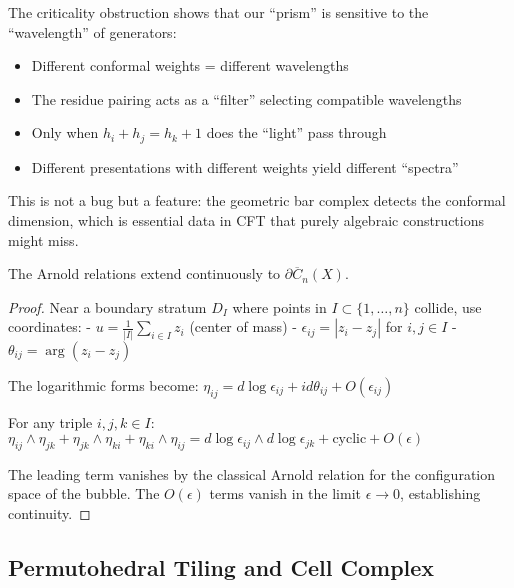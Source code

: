   \begin{remark}
   The criticality obstruction shows that our ``prism'' is sensitive to the ``wavelength'' of generators:
   \begin{itemize}
   \item Different conformal weights = different wavelengths
   \item The residue pairing acts as a ``filter'' selecting compatible wavelengths
   \item Only when $h_i + h_j = h_k + 1$ does the ``light'' pass through
   \item Different presentations with different weights yield different ``spectra''
   \end{itemize}
   
   This is not a bug but a feature: the geometric bar complex detects the conformal dimension, which is 
   essential data in CFT that purely algebraic constructions might miss.
   \end{remark}
   
\begin{lemma}\label{lem:arnold-boundary}
The Arnold relations extend continuously to $\partial \overline{C}_n(X)$.
\end{lemma}

\begin{proof}
Near a boundary stratum $D_I$ where points in $I \subset \{1,\ldots,n\}$ collide, use coordinates:
- $u = \frac{1}{|I|}\sum_{i \in I} z_i$ (center of mass)
- $\epsilon_{ij} = |z_i - z_j|$ for $i,j \in I$
- $\theta_{ij} = \arg(z_i - z_j)$

The logarithmic forms become:
$\eta_{ij} = d\log \epsilon_{ij} + id\theta_{ij} + O(\epsilon_{ij})$

For any triple $i,j,k \in I$:
$\eta_{ij} \wedge \eta_{jk} + \eta_{jk} \wedge \eta_{ki} + \eta_{ki} \wedge \eta_{ij} = d\log \epsilon_{ij} \wedge d\log \epsilon_{jk} + \text{cyclic} + O(\epsilon)$

The leading term vanishes by the classical Arnold relation for the configuration space of the bubble. The $O(\epsilon)$ terms vanish in the limit $\epsilon \to 0$, establishing continuity.
\end{proof}

\subsection{Permutohedral Tiling and Cell Complex}
 
